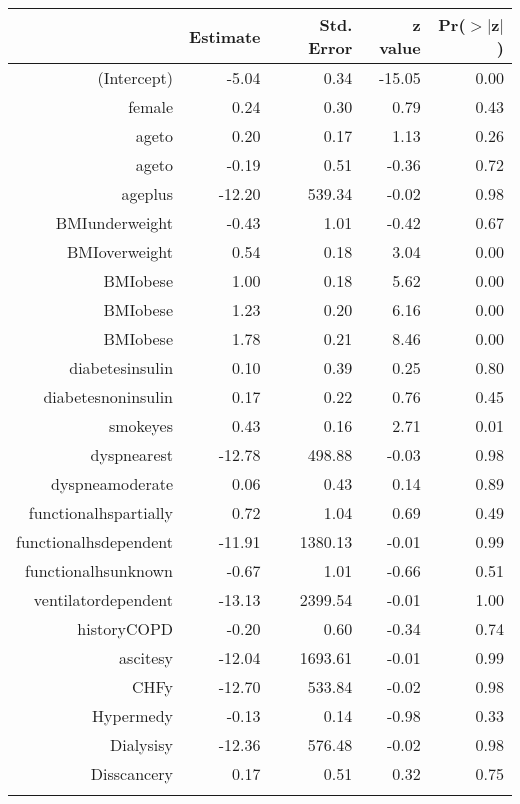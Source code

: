 
\bigskip\bigskip
\centering
\begin{tabular}{rrrrr}
  \hline
 & Estimate & Std. Error & z value & Pr($>$$|$z$|$) \\ 
  \hline
(Intercept) & -5.04 & 0.34 & -15.05 & 0.00 \\ 
  female & 0.24 & 0.30 & 0.79 & 0.43 \\ 
  age\-65\-to\-74 & 0.20 & 0.17 & 1.13 & 0.26 \\ 
  age\-75\-to\-84 & -0.19 & 0.51 & -0.36 & 0.72 \\ 
  age\-85\-plus & -12.20 & 539.34 & -0.02 & 0.98 \\ 
  BMI\-underweight & -0.43 & 1.01 & -0.42 & 0.67 \\ 
  BMI\-overweight & 0.54 & 0.18 & 3.04 & 0.00 \\ 
  BMI\-obese\-1 & 1.00 & 0.18 & 5.62 & 0.00 \\ 
  BMI\-obese\-2 & 1.23 & 0.20 & 6.16 & 0.00 \\ 
  BMI\-obese\-3 & 1.78 & 0.21 & 8.46 & 0.00 \\ 
  diabetes\-insulin & 0.10 & 0.39 & 0.25 & 0.80 \\ 
  diabetes\-noninsulin & 0.17 & 0.22 & 0.76 & 0.45 \\ 
  smoke\-yes & 0.43 & 0.16 & 2.71 & 0.01 \\ 
  dyspnea\-rest & -12.78 & 498.88 & -0.03 & 0.98 \\ 
  dyspnea\-moderate & 0.06 & 0.43 & 0.14 & 0.89 \\ 
  functional\-hs\-partially & 0.72 & 1.04 & 0.69 & 0.49 \\ 
  functional\-hs\-dependent & -11.91 & 1380.13 & -0.01 & 0.99 \\ 
  functional\-hs\-unknown & -0.67 & 1.01 & -0.66 & 0.51 \\ 
  ventilator\-dependent & -13.13 & 2399.54 & -0.01 & 1.00 \\ 
  history\-COPD & -0.20 & 0.60 & -0.34 & 0.74 \\ 
  ascites\-y & -12.04 & 1693.61 & -0.01 & 0.99 \\ 
  CHF\-y & -12.70 & 533.84 & -0.02 & 0.98 \\ 
  Hyper\-med\-y & -0.13 & 0.14 & -0.98 & 0.33 \\ 
  Dialysis\-y & -12.36 & 576.48 & -0.02 & 0.98 \\ 
  Diss\-cancer\-y & 0.17 & 0.51 & 0.32 & 0.75 \\ 
$$
\end{tabular}
